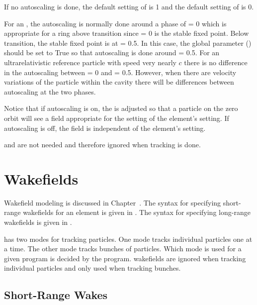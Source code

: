 If no autoscaling is done, the default setting of  is 1 and the default setting
of  is 0.

For an , the autoscaling is normally done around a phase of  = 0 which is
appropriate for a ring above transition since  = 0 is the stable fixed point. Below
transition, the stable fixed point is at  = 0.5. In this case, the  global
parameter  () should be set to True so that
autoscaling is done around  = 0.5. For an ultrarelativistic reference particle with speed
very nearly $c$ there is no difference in the autoscaling between  = 0 and  = 0.5.
However, when there are velocity variations of the particle within the cavity there will be
differences between autoscaling at the two phases.

Notice that if autoscaling is on, the  is adjusted so that a particle on the
zero orbit will see a field appropriate for the setting of the element's  setting.  If
autoscaling is off, the field is independent of the element's  setting.

 and  are not needed and therefore ignored when
 tracking is done.

\section{Wakefields}
\label{s:wakes}

Wakefield modeling is discussed in Chapter~. The syntax for specifying
short-range wakefields for an element is given in . The syntax for specifying
long-range wakefields is given in .

\bmad has two modes for tracking particles. One mode tracks individual particles one at a time. The
other mode tracks bunches of particles. Which mode is used for a given program is decided by the
program. wakefields are ignored when tracking individual particles and only used when tracking
bunches.

\subsection{Short-Range Wakes}
\label{s:sr.wake.syntax}

